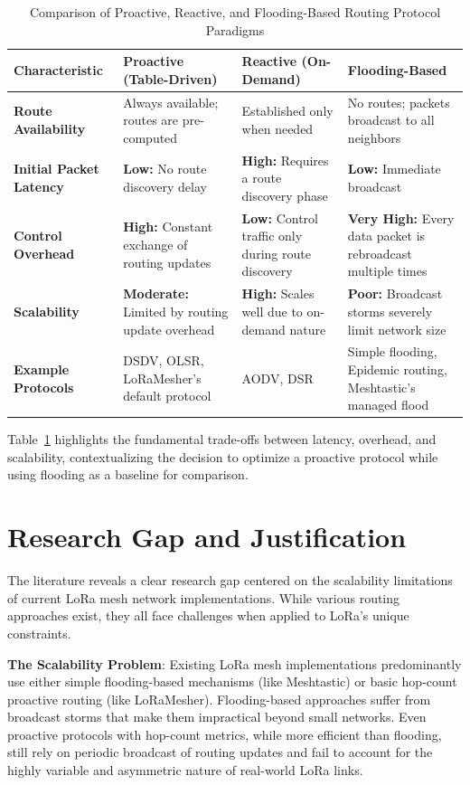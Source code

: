 \begin{table}[H]
\centering
\caption{Comparison of Proactive, Reactive, and Flooding-Based Routing Protocol Paradigms}
\label{tab:routing_protocol_comparison}
\begin{tabular}{p{3cm}p{3.5cm}p{3.5cm}p{3.5cm}}
\hline
\textbf{Characteristic} & \textbf{Proactive (Table-Driven)} & \textbf{Reactive (On-Demand)} & \textbf{Flooding-Based} \\
\hline
\textbf{Route Availability} & Always available; routes are pre-computed & Established only when needed & No routes; packets broadcast to all neighbors \\
\hline
\textbf{Initial Packet Latency} & \textbf{Low:} No route discovery delay & \textbf{High:} Requires a route discovery phase & \textbf{Low:} Immediate broadcast \\
\hline
\textbf{Control Overhead} & \textbf{High:} Constant exchange of routing updates & \textbf{Low:} Control traffic only during route discovery & \textbf{Very High:} Every data packet is rebroadcast multiple times \\
\hline
\textbf{Scalability} & \textbf{Moderate:} Limited by routing update overhead & \textbf{High:} Scales well due to on-demand nature & \textbf{Poor:} Broadcast storms severely limit network size \\
\hline
\textbf{Example Protocols} & DSDV, OLSR, LoRaMesher's default protocol & AODV, DSR & Simple flooding, Epidemic routing, Meshtastic's managed flood \\
\hline
\end{tabular}
\end{table}

Table~\ref{tab:routing_protocol_comparison} highlights the fundamental trade-offs between latency, overhead, and scalability, contextualizing the decision to optimize a proactive protocol while using flooding as a baseline for comparison.

\section{Research Gap and Justification}

The literature reveals a clear research gap centered on the scalability limitations of current LoRa mesh network implementations. While various routing approaches exist, they all face challenges when applied to LoRa's unique constraints.

\textbf{The Scalability Problem}: Existing LoRa mesh implementations predominantly use either simple flooding-based mechanisms (like Meshtastic) or basic hop-count proactive routing (like LoRaMesher). Flooding-based approaches suffer from broadcast storms that make them impractical beyond small networks. Even proactive protocols with hop-count metrics, while more efficient than flooding, still rely on periodic broadcast of routing updates and fail to account for the highly variable and asymmetric nature of real-world LoRa links.

